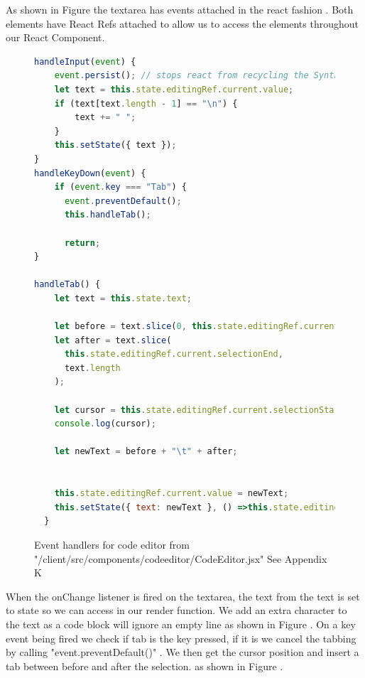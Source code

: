 As shown in Figure  the textarea has events attached in the react fashion \cite{reactEvents}. Both elements have
React Refs \cite{reactRefs} attached to allow us to access the elements throughout our React Component.
\begin{figure}[h]
    \begin{lstlisting}[language=Javascript]
handleInput(event) {
    event.persist(); // stops react from recycling the SyntheticEvent on re-render
    let text = this.state.editingRef.current.value;
    if (text[text.length - 1] == "\n") {
        text += " ";
    }
    this.setState({ text });
}
handleKeyDown(event) {
    if (event.key === "Tab") {
      event.preventDefault();
      this.handleTab();

      return;
}

handleTab() {
    let text = this.state.text;

    let before = text.slice(0, this.state.editingRef.current.selectionStart);
    let after = text.slice(
      this.state.editingRef.current.selectionEnd,
      text.length
    );
   
    let cursor = this.state.editingRef.current.selectionStart + 1;
    console.log(cursor);
    
    let newText = before + "\t" + after;
    

    this.state.editingRef.current.value = newText;
    this.setState({ text: newText }, () =>this.state.editingRef.current.setSelectionRange(cursor, cursor));
  }
    \end{lstlisting}
    \caption{Event handlers for code editor from "/client/src/components/code\textunderscore{}editor/CodeEditor.jsx" See Appendix K}
    \label{fig:event-handlers}
\end{figure}
When the onChange listener is fired on the textarea, the text from the text is set to state so we can access in our render function. 
We add an extra character to the text as a code block will ignore an empty line as shown in Figure .
\newline
On a key event being fired we check if tab is the key pressed, if it is we cancel the tabbing by calling "event.preventDefault()" \cite{preventDefault}.
We then get the cursor position and insert a tab between before and after the selection. as shown in Figure .

